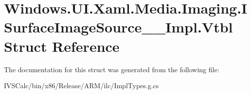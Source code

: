 \hypertarget{struct_windows_1_1_u_i_1_1_xaml_1_1_media_1_1_imaging_1_1_i_surface_image_source_____impl_1_1_vtbl}{}\section{Windows.\+U\+I.\+Xaml.\+Media.\+Imaging.\+I\+Surface\+Image\+Source\+\_\+\+\_\+\+Impl.\+Vtbl Struct Reference}
\label{struct_windows_1_1_u_i_1_1_xaml_1_1_media_1_1_imaging_1_1_i_surface_image_source_____impl_1_1_vtbl}


The documentation for this struct was generated from the following file\+:\begin{DoxyCompactItemize}
\item 
I\+V\+S\+Calc/bin/x86/\+Release/\+A\+R\+M/ilc/Impl\+Types.\+g.\+cs\end{DoxyCompactItemize}
